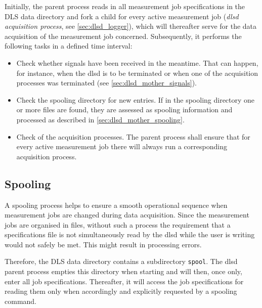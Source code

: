 \documentclass[a4paper,12pt,BCOR6mm,bibtotoc,idxtotoc]{scrbook}
\begin{document}
Initially, the parent process reads in all measurement job specifications in
the DLS data directory and fork a child for every active
measurement job  (\textit{dlsd acquisition process}, see
\autoref{sec:dlsd_logger}), which will thereafter serve for the data
acquisition of the measurement job concerned. Subsequently, it performs the
following tasks in a defined time interval:

\begin{itemize}

\item Check whether signals have been received in the meantime. That can
happen, for instance, when the dlsd is to be terminated or when one of the
acquisition processes was terminated (see \autoref{sec:dlsd_mother_signals}).

\item Check the spooling directory for new entries. If in the spooling
directory one or more files are found, they are assessed as spooling
information and processed as described in \autoref{sec:dlsd_mother_spooling}.

\item Check of the acquisition processes. The parent process shall ensure that
for every active measurement job there will always run a corresponding
acquisition process.

\end{itemize}


\subsection{Spooling} \label{sec:dlsd_mother_spooling} 

A spooling process helps to ensure a smooth operational sequence when measurement jobs  are changed during data acquisition. Since the measurement jobs are organised in files, without such a process the requirement that a specifications file is not simultaneously read by the dlsd while the user is writing would not safely be met. This might result in processing errors.

Therefore, the DLS data directory contains a subdirectory \texttt{spool}. The dlsd parent process empties this directory when starting and will then, once only, enter all job specifications. Thereafter, it will access the job specifications for reading them only when accordingly and explicitly requested by a spooling command.
\end{document}
